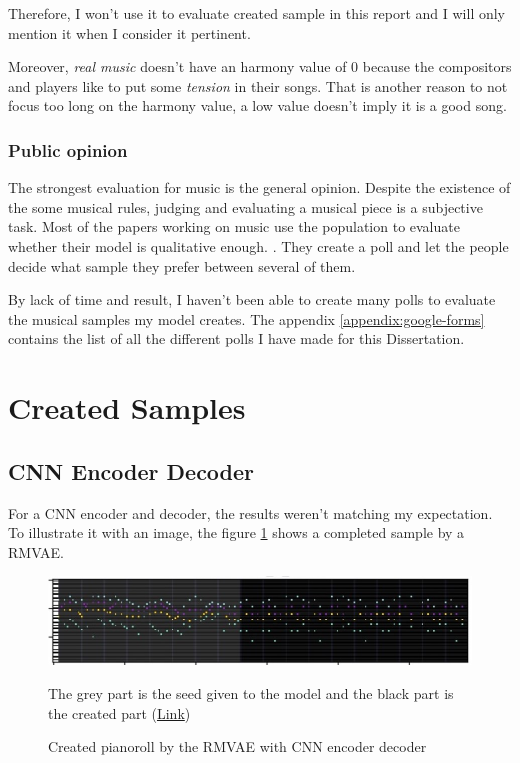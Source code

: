 \documentclass[12pt]{report}
\begin{document}
Therefore, I won't use it to evaluate created sample in this report and I will only mention it when I consider it pertinent.

Moreover, \textit{real music} doesn't have an harmony value of $0$ because the compositors and players like to put some \textit{tension} in their songs.
That is another reason to not focus too long on the harmony value, a low value doesn't imply it is a good song.

\subsubsection{Public opinion}
\label{sec:eval:creation:public}

The strongest evaluation for music is the general opinion.
Despite the existence of the some musical rules, judging and evaluating a musical piece is a subjective task.
Most of the papers working on music use the population to evaluate whether their model is qualitative enough. \cite{huang_counterpoint_2017, hadjeres_deepbach:_2016, huang_music_2018, liang_automatic_2017, huang_bach_2019}.
They create a poll and let the people decide what sample they prefer between several of them.

By lack of time and result, I haven't been able to create many polls to evaluate the musical samples my model creates.
The appendix \ref{appendix:google-forms} contains the list of all the different polls I have made for this Dissertation.

\section{Created Samples}
\label{sec:results:samples}

\subsection{CNN Encoder Decoder}

For a CNN encoder and decoder, the results weren't matching my expectation.
To illustrate it with an image, the figure \ref{fig:rmvae-generated} shows a completed sample by a RMVAE.

\begin{figure}[htpb]
    \centering
    \includegraphics[width=\textwidth]{images/generated_midis/RMVAE/generated_cnn.jpg}
    \caption{Created pianoroll by the RMVAE with CNN encoder decoder}
    The grey part is the seed given to the model and the black part is the created part   (\href{https://github.com/ValentinVignal/midiGenerator/blob/master/samples/results/generated_pianoroll.mid}{Link})
    \label{fig:rmvae-generated}
\end{figure}
\end{document}

